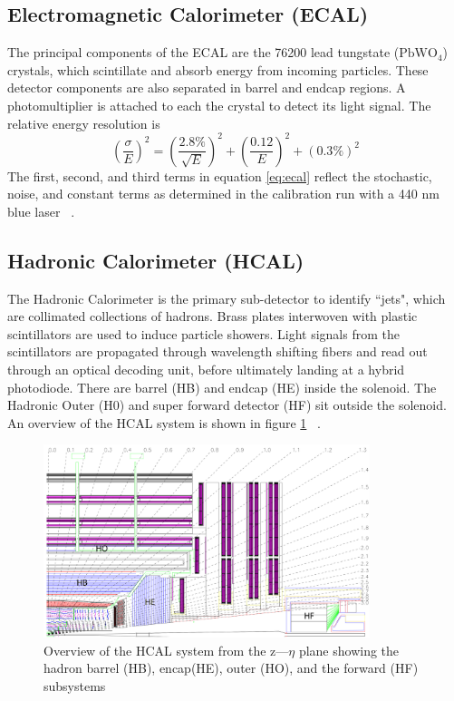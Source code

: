 \subsection{Electromagnetic Calorimeter (ECAL)}

The principal components of the ECAL are the 76200 lead tungstate ($\text{PbWO}_4$) crystals, which scintillate and absorb energy from incoming particles. These detector components are also separated in barrel and endcap regions. A photomultiplier is attached to each the crystal to detect its light signal. The relative energy resolution is 
\begin{equation*}
\label{eq:ecal}
\left(\frac{\sigma}{E}\right)^2 = \left( \frac{2.8\%}{\sqrt{E}}  \right)^2 + \left( \frac{0.12}{E}  \right)^2 + (0.3\%)^2 
\end{equation*}
 The first, second, and third terms in equation \ref{eq:ecal} reflect the stochastic, noise, and constant terms as determined in the calibration run with a 440 nm blue laser ~\cite{Chatrchyan:2008zzk,Eichhorn:2112017}. 

\subsection{Hadronic Calorimeter (HCAL)} 
The Hadronic Calorimeter is the primary sub-detector to identify ``jets", which are collimated collections of hadrons. 
Brass plates interwoven with plastic scintillators are used to induce particle showers. 
Light signals from the scintillators are propagated through wavelength shifting fibers and read out through an optical decoding unit, before ultimately landing at a hybrid photodiode. 
There are barrel (HB) and endcap (HE) inside the solenoid. The Hadronic Outer (H0) and super forward detector (HF) sit outside the solenoid. An overview of the HCAL system is shown in figure \ref{fig:hcal} ~\cite{Chatrchyan:2008zzk,Eichhorn:2112017}. 

\begin{figure}[ht!b]
  \centering
\includegraphics[width=0.85\textwidth]{figures/HCAL.png}    
    \caption{\label{fig:hcal} Overview of the HCAL system from the z---$\eta$ plane showing the hadron barrel (HB), encap(HE), outer (HO), and the forward (HF) subsystems ~\cite{Chatrchyan:2008zzk}}
\end{figure}




